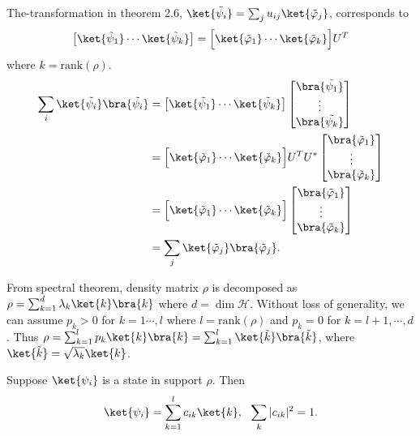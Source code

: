 \documentclass[a4paper,12pt]{article}
\begin{document}
	The-transformation in theorem 2.6, $\ket{\tilde{\psi}_i} = \sum_j u_{ij} \ket{\tilde{\varphi}_j}$, corresponds to
	\begin{align*}
	    \left[ \ket{\tilde{\psi}_1} \cdots \ket{\tilde{\psi}_k} \right] = \Big[ \ket{\tilde{\varphi}_1} \cdots \ket{\tilde{\varphi}_k} \Big] U^T
	\end{align*}
	where $k = \mathrm{rank} (\mathcal{\rho})$.
    \begin{align}
        \sum_i \ket{\tilde{\psi_i}}\bra{\tilde{\psi_i}} &= \left[ \ket{\tilde{\psi}_1} \cdots \ket{\tilde{\psi}_k} \right]
            \begin{bmatrix}
                \bra{\tilde{\psi_1}}\\
                \vdots\\
                \bra{\tilde{\psi_k}}
            \end{bmatrix}\\
        &= \Big[ \ket{\tilde{\varphi}_1} \cdots \ket{\tilde{\varphi}_k} \Big] U^T
            U^* \begin{bmatrix}
                    \bra{\tilde{\varphi}_1}\\
                    \vdots\\
                    \bra{\tilde{\varphi}_k}
            \end{bmatrix}\\
        &= \Big[ \ket{\tilde{\varphi}_1} \cdots \ket{\tilde{\varphi}_k} \Big]
             \begin{bmatrix}
                \bra{\tilde{\varphi}_1}\\
                \vdots\\
                \bra{\tilde{\varphi}_k}
            \end{bmatrix}\\
        &= \sum_j \ket{\tilde{\varphi}_j}\bra{\tilde{\varphi}_j}.
    \end{align}

From spectral theorem, density matrix $\rho$ is decomposed as $\rho = \sum_{k=1}^{d} \lambda_k \ket{k}\bra{k}$ where $d = \dim \mathcal{H}$.
Without loss of generality, we can assume $p_k > 0$ for $k = 1 \cdots , l$ where $l = \mathrm{rank} (\rho)$ and $p_k = 0$ for $k = l+1, \cdots, d$.
Thus $\rho = \sum_{k=1}^{l} p_k \ket{k}\bra{k} = \sum_{k=1}^{l} \ket{\tilde{k}}\bra{\tilde{k}}$, where $\ket{\tilde{k}} = \sqrt{\lambda_k} \ket{k}$.

Suppose $\ket{\psi_i}$ is a state in support $\rho$. Then
\begin{align*}
	\ket{\psi_i} = \sum_{k=1}^l c_{ik} \ket{k}, ~~ \sum_k |c_{ik}|^2 = 1.
\end{align*}
\end{document}
